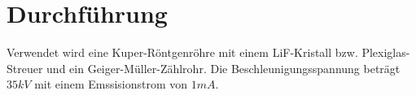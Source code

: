 \newpage
\section{Durchführung}
Verwendet wird eine Kuper-Röntgenröhre mit einem LiF-Kristall bzw. Plexiglas-Streuer und
ein Geiger-Müller-Zählrohr.
Die Beschleunigungsspannung beträgt $35\si{kV}$ mit einem Emssisionstrom von $1\si{mA}$.

\label{sec:Durchfuehrung}

